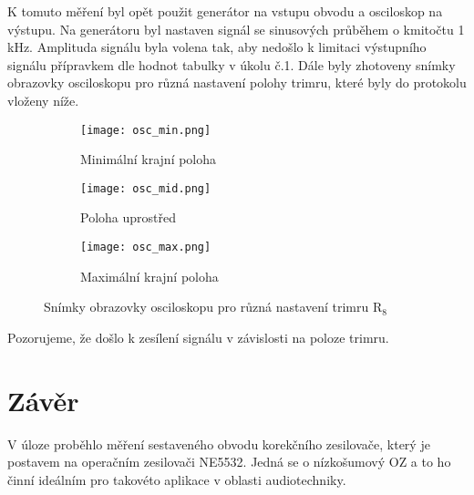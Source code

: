 \documentclass[a4paper, czech]{article}
\begin{document}
K tomuto měření byl opět použit generátor na vstupu obvodu a osciloskop na výstupu.
Na generátoru byl nastaven signál se sinusových průběhem o kmitočtu 1\,kHz.
Amplituda signálu byla volena tak, aby nedošlo k limitaci výstupního signálu přípravkem
dle hodnot tabulky v úkolu č.1.
Dále byly zhotoveny snímky obrazovky osciloskopu pro různá nastavení polohy trimru,
které byly do protokolu vloženy níže.

\begin{figure}[H]
    \centering
    \begin{subfigure}{0.49\textwidth}
        \texttt{[image: osc\_min.png]}
        \caption{Minimální krajní poloha}
    \end{subfigure}
    \hfill
    \begin{subfigure}{0.49\textwidth}
        \texttt{[image: osc\_mid.png]}
        \caption{Poloha uprostřed}
    \end{subfigure}

    \begin{subfigure}{0.49\textwidth}
        \texttt{[image: osc\_max.png]}
        \caption{Maximální krajní poloha}
    \end{subfigure}
    \caption{Snímky obrazovky osciloskopu pro různá nastavení trimru $\text{R}_8$} 
\end{figure}


Pozorujeme, že došlo k zesílení signálu v závislosti na poloze trimru. %

\section{Závěr}
V úloze proběhlo měření sestaveného obvodu korekčního zesilovače, který je postavem na operačním zesilovači NE5532. Jedná se o nízkošumový OZ a to ho činní ideálním pro takovéto aplikace v oblasti audiotechniky. 

\end{document}
